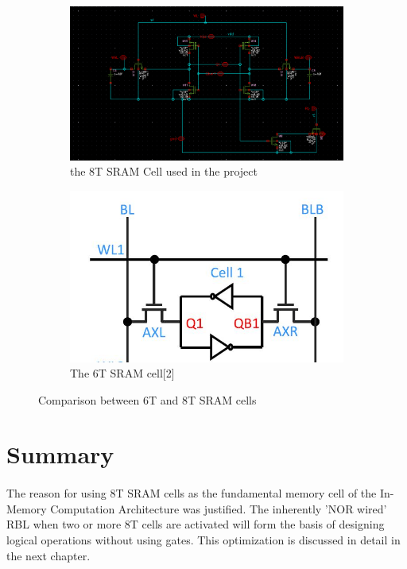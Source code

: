 \begin{figure}[h]
\begin{subfigure}{0.5\textwidth}
\includegraphics[width=0.9\linewidth, height = 0.7\linewidth]{chapters/chapter03/8t_sram_cell.png} 
\caption{the 8T SRAM Cell used in the project}
\label{fig:Figure}
\end{subfigure}
\begin{subfigure}{0.5\textwidth}
\includegraphics[width=0.9\linewidth, height = 0.7\linewidth]{6tsram.JPG}
\caption{The 6T SRAM cell[2]}
\label{fig:Figure}
\end{subfigure}
 
\caption{Comparison between 6T and 8T SRAM cells}
\label{fig:Figure}
\end{figure}




\section{Summary}

\paragraph{}
The reason for using 8T SRAM cells as the fundamental memory cell of the In-Memory Computation Architecture was justified. The inherently 'NOR wired' RBL when two or more 8T cells are activated will form the basis of designing logical operations without using gates. This optimization is discussed in detail in the next chapter. 